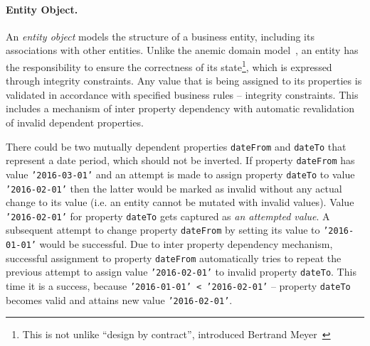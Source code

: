 \documentclass[a4paper,12pt,oneside,openright,final]{memoir} %
\begin{document}
	\paragraph{Entity Object.} 	
  	An \emph{entity object} models the structure of a business entity, including its associations with other entities.
	Unlike the anemic domain model~\cite{fowler2003}, an entity has the responsibility to ensure the correctness of its state\footnote{This is not unlike ``design by contract'', introduced Bertrand Meyer~\cite{bm1997}}, which is expressed through integrity constraints.
	Any value that is being assigned to its properties is validated in accordance with specified business rules – integrity constraints.
	This includes a mechanism of inter property dependency with automatic revalidation of invalid dependent properties.
	
	\begin{tcolorbox}[title=Example: dependent properties]
	\footnotesize
		There could be two mutually dependent properties \texttt{dateFrom} and \texttt{dateTo} that represent a date period, which should not be inverted.
		If property \texttt{dateFrom} has value \texttt{'2016-03-01'} and an attempt is made to assign property \texttt{dateTo} to value \texttt{'2016-02-01'} then the latter would be marked as invalid without any actual change to its value (i.e. an entity cannot be mutated with invalid values).
		Value \texttt{'2016-02-01'} for property \texttt{dateTo} gets captured as \emph{an attempted value}.
		A subsequent attempt to change property \texttt{dateFrom} by setting its value to \texttt{'2016-01-01'} would be successful.
		Due to inter property dependency mechanism, successful assignment to property \texttt{dateFrom} automatically tries to repeat the previous attempt to assign value \texttt{'2016-02-01'} to invalid property \texttt{dateTo}.
		This time it is a success, because \texttt{'2016-01-01' < '2016-02-01'} -- property \texttt{dateTo} becomes valid and attains new value \texttt{'2016-02-01'}.
 	\end{tcolorbox}
	
\end{document}
